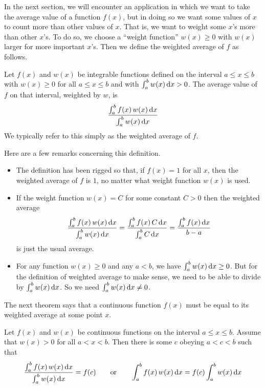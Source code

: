 In the next section, we will encounter an application in which we want to take the average value of a function $f(x)$, but in doing so we want some values 
of $x$ to count more than other values of $x$. That is, we want to weight 
some $x$'s more than other $x$'s. To do so, we choose a ``weight function'' 
$w(x)\ge 0$ with $w(x)$ larger for more important $x$'s.  Then we define the weighted average of $f$ as follows.
\begin{defn}\label{def:Wtaverage}
Let $f(x)$ and $w(x)$ be integrable functions defined on the interval
$a\le x\le b$ with $w(x)\ge 0$ for all $a\le x\le b$ and with $\int_a^b w(x)\, \mathrm{d}x>0$.  The average value of $f$ on that interval, weighted by $w$, is
\begin{align*}
\frac{\int_a^b f(x)\,w(x)\,\mathrm{d}x}{\int_a^b w(x)\,\mathrm{d}x}
\end{align*}
We typically refer to this simply as the weighted average of $f$.
\end{defn}\noindent
Here are a few remarks concerning this definition.
\begin{itemize}
\item
The definition has been rigged so that, if $f(x)=1$ for all $x$, then the 
weighted average of $f$ is $1$, no matter what weight function $w(x)$ is used.
\item
If the weight function $w(x)=C$ for some constant $C>0$ then the weighted average
\begin{equation*}
\frac{\int_a^b f(x)\,w(x)\,\mathrm{d}x}{\int_a^b w(x)\,\mathrm{d}x}
=\frac{\int_a^b f(x)\,C\,\mathrm{d}x}{\int_a^b C\,\mathrm{d}x}
=\frac{\int_a^b f(x)\,\mathrm{d}x}{b-a}
\end{equation*}
is just the usual average.
\item
For any function $w(x)\ge 0$ and any $a<b$, we have $\int_a^b w(x)\, \mathrm{d}x\ge 0$.
But for the definition of weighted average to make sense, we need to be able to divide
by $\int_a^b w(x)\, \mathrm{d}x$. So we need $\int_a^b w(x)\, \mathrm{d}x\ne 0$. 

\end{itemize}

The next theorem says that a continuous function $f(x)$ must be equal to
its weighted average at some point $x$.
\begin{theorem}\label{thm:AVwtmvt}
Let $f(x)$ and $w(x)$ be continuous functions on the interval $a\le x\le b$.
Assume that $w(x)>0$ for all $a<x<b$. Then there is some $c$ 
obeying $a < c < b$ such that
\begin{align*}
\frac{\int_a^b f(x)\,w(x)\,\mathrm{d}x}{\int_a^b w(x)\,\mathrm{d}x}=f(c) \qquad\text{or}\qquad
\int_a^b f(x)\,w(x)\,\mathrm{d}x = f(c)\int_a^b w(x)\,\mathrm{d}x
\end{align*}
\end{theorem}

